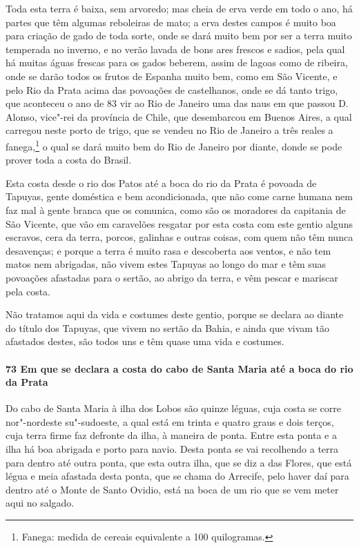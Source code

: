Toda esta terra é baixa, sem arvoredo; mas cheia de erva verde em todo o ano, há partes
que têm algumas reboleiras de mato; a erva destes campos é muito boa para criação de gado
de toda sorte, onde se dará muito bem por ser a terra muito temperada no inverno, e no
verão lavada de bons ares frescos e sadios, pela qual há muitas águas frescas para os
gados beberem, assim de lagoas como de ribeira, onde se darão todos os frutos de Espanha
muito bem, como em São Vicente, e pelo Rio da Prata acima das povoações de castelhanos,
onde se dá tanto trigo, que aconteceu o ano de 83 vir ao Rio de Janeiro uma das naus em
que passou D. Alonso, vice"-rei da província de Chile, que desembarcou em Buenos Aires, a
qual carregou neste porto de trigo, que se vendeu no Rio de Janeiro a três reales a
fanega,\footnote{ Fanega: medida de cereais equivalente a 100 quilogramas.} o qual se dará
muito bem do Rio de Janeiro por diante, donde se pode prover toda a costa do Brasil.

Esta costa desde o rio dos Patos até a boca do rio da Prata é povoada de Tapuyas, gente
doméstica e bem acondicionada, que não come carne humana nem faz mal à gente branca que os
comunica, como são os moradores da capitania de São Vicente, que vão em caravelões
resgatar por esta costa com este gentio alguns escravos, cera da terra, porcos, galinhas e
outras coisas, com quem não têm nunca desavenças; e porque a terra é muito rasa e
descoberta aos ventos, e não tem matos nem abrigadas, não vivem estes Tapuyas ao longo do
mar e têm suas povoações afastadas para o sertão, ao abrigo da terra, e vêm pescar e
mariscar pela costa.

Não tratamos aqui da vida e costumes deste gentio, porque se declara ao diante do título
dos Tapuyas, que vivem no sertão da Bahia, e ainda que vivam tão afastados destes, são
todos uns e têm quase uma vida e costumes.

\paragraph{73 Em que se declara a costa do cabo de Santa Maria até a boca do rio da Prata}

Do cabo de Santa Maria à ilha dos Lobos são quinze léguas, cuja costa se corre
nor"-nordeste su"-sudoeste, a qual está em trinta e quatro graus e dois terços, cuja terra
firme faz defronte da ilha, à maneira de ponta. Entre esta ponta e a ilha há boa abrigada
e porto para navio. Desta ponta se vai recolhendo a terra para dentro até outra ponta, que
esta outra ilha, que se diz a das Flores, que está légua e meia afastada desta ponta, que
se chama do Arrecife, pelo haver daí para dentro até o Monte de Santo Ovidio, está na boca
de um rio que se vem meter aqui no salgado.

